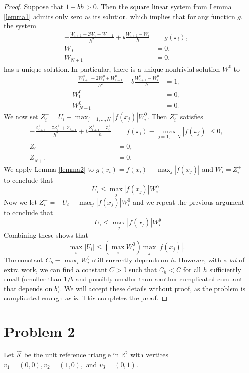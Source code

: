 \documentclass{article}
\theoremstyle{plain}
\begin{document}
\begin{proof}
	Suppose that $1-bh > 0$.
	Then the square linear system from Lemma \ref{lemma1} admits only zero as its solution, which implies that for any function $g$, the system
	\begin{align*}
		-\frac{W_{i+1}-2W_i+W_{i-1}}{h^2} + b\frac{W_{i+1}-W_i}{h} & = g(x_i), \\
		W_0                                                        & = 0,      \\
		W_{N+1}                                                    & = 0,
	\end{align*}
	has a unique solution.
	In particular, there is a unique nontrivial solution $W^0$ to
	\begin{align*}
		-\frac{W_{i+1}^0-2W_i^0+W_{i-1}^0}{h^2} + b\frac{W_{i+1}^0-W_i^0}{h} & = 1, \\
		W_0^0                                                                & = 0, \\
		W_{N+1}^0                                                            & = 0.
	\end{align*}
	We now set $Z_i^+ = U_i - \max_{j=1,\dots,N}|f(x_j)|W_i^0$.
	Then $Z_i^+$ satisfies
	\begin{align*}
		-\frac{Z_{i+1}^+-2Z_i^++Z_{i-1}^+}{h^2} + b\frac{Z_{i+1}^+-Z_i^+}{h} & = f(x_i) - \max_{j=1,\dots,N}|f(x_j)| \leq 0, \\
		Z_0^+                                                                & = 0,                                          \\
		Z_{N+1}^+                                                            & = 0.
	\end{align*}
	We apply Lemma \ref{lemma2} to $g(x_i) = f(x_i) - \max_j|f(x_j)|$ and $W_i = Z_i^+$ to conclude that
	\[U_i \leq \max_j|f(x_j)|W_i^0.\]
	Now we let $Z_i^- = -U_i - \max_j|f(x_j)|W_i^0$ and we repeat the previous argument to conclude that
	\[-U_i \leq \max_j|f(x_j)|W_i^0.\]
	Combining these shows that
	\[\max_i|U_i|\leq (\max_iW_i^0)\max_j|f(x_j)|.\]
	The constant $C_h = \max_iW_i^0$ still currently depends on $h$.
	However, with a \emph{lot} of extra work, we can find a constant $C > 0$ such that $C_h < C$ for all $h$ sufficiently small (smaller than $1/b$ and possibly smaller than another complicated constant that depends on $b$).
	We will accept these details without proof, as the problem is complicated enough as is.
	This completes the proof.
\end{proof}

\section*{Problem 2}
Let $\widehat K$ be the unit reference triangle in $\mathbb R^2$ with vertices $v_1 = (0,0), v_2 = (1,0),$ and $v_3 = (0,1)$.
\end{document}
